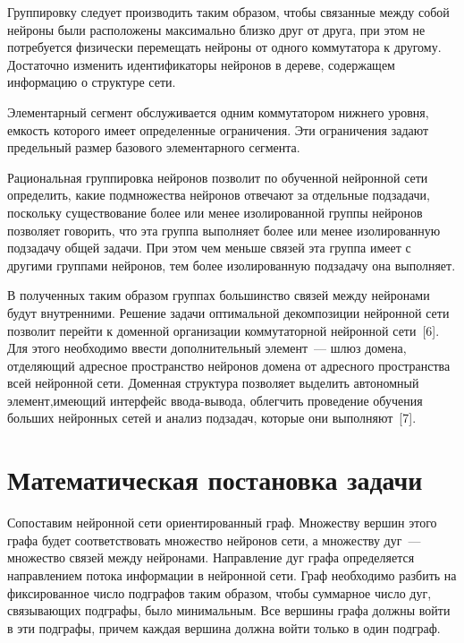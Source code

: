 \begin{multicols}{2}
     Группировку следует производить таким образом, чтобы связанные 
между собой нейроны  были расположены максимально близко друг от 
друга, при этом не потребуется физически перемещать нейроны от одного 
коммутатора к другому. Достаточно изменить идентификаторы нейронов в 
дереве, содержащем информацию о структуре сети.
     
     Элементарный сегмент обслуживается одним коммутатором нижнего 
уровня, емкость которого имеет определенные ограничения. Эти 
ограничения задают предельный размер базового элементарного сегмента.
     
     Рациональная группировка нейронов позволит по обученной 
нейронной сети определить, какие подмножества нейронов отвечают за 
отдельные подзадачи, поскольку существование более или менее 
изолированной группы нейронов позволяет говорить, что эта группа 
выполняет более или менее изолированную подзадачу общей задачи. При 
этом чем меньше связей эта группа имеет с другими группами нейронов, тем 
более изолированную подзадачу она выполняет.
     
     В полученных таким образом группах большинство связей между 
нейронами будут внутренними. Решение задачи оптимальной декомпозиции 
нейронной сети позволит перейти к доменной орга\-низации коммутаторной 
нейронной сети~[6]. Для этого необходимо ввести дополнительный\linebreak 
элемент~--- шлюз домена, отделяющий адресное пространство нейронов 
домена от адресного пространства всей нейронной сети. Доменная струк\-тура 
позволяет выделить автономный элемент,\linebreak име\-ющий интерфейс 
     ввода-вывода, облегчить проведение обучения больших нейронных 
сетей и анализ подзадач, которые они выполняют~[7].

\section{Математическая постановка задачи}

     Сопоставим нейронной сети ориентированный граф. Множеству 
вершин этого графа будет соответствовать множество нейронов сети, а 
множеству дуг~--- множество связей между нейронами. 
Направление дуг графа определяется направлением потока информации в 
нейронной сети. Граф необходимо разбить на фиксированное число 
подграфов таким образом, чтобы суммарное число дуг, связывающих 
подграфы, было минимальным. Все вершины графа должны войти в эти 
подграфы, причем каждая вершина должна войти только в один подграф.


\end{multicols}
